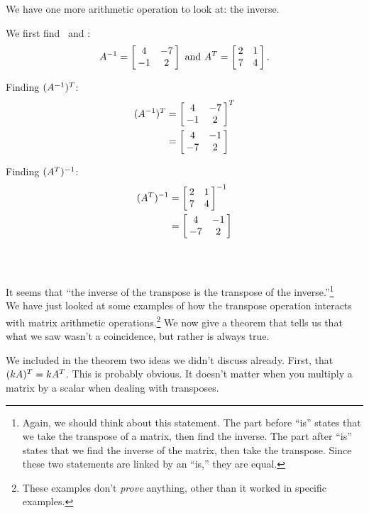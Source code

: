 We have one more arithmetic operation to look at: the inverse.\\

{We first find \ttai\ and \ttat:
$$\ttai = \bmx{cc} 4&-7\\-1&2\emx\ \text{and}\ \ttat = \bmx{cc}2&1\\7&4\emx.$$

Finding $(\ttai)^T$:
\begin{align*}
	(\ttai)^T &= \bmx{cc} 4&-7\\-1&2\emx ^T \\
					&=	\bmx{cc}4&-1\\-7&2\emx
\end{align*}

Finding $(\ttat)^{-1}$:
\begin{align*}
	(\ttat)^{-1}	&=	\bmx{cc}2&1\\7&4\emx^{-1}\\
							&=	\bmx{cc}4&-1\\-7&2\emx
\end{align*}
\ } \\ %

It seems that ``the inverse of the transpose is the transpose of the inverse.''\footnote{Again, we should think about this statement. The part before ``is'' states that we take the transpose of a matrix, then find the inverse. The part after ``is'' states that we find the inverse of the matrix, then take the transpose. Since these two statements are linked by an ``is,'' they are equal.}\\

We have just looked at some examples of how the transpose operation interacts with matrix arithmetic operations.\footnote{These examples don't \textit{prove} anything, other than it worked in specific examples.} We now give a theorem that tells us that what we saw wasn't a coincidence, but rather is always true.

We included in the theorem two ideas we didn't discuss already. First, that $(k\tta)^T = k\ttat$. This is probably obvious. It doesn't matter when you multiply a matrix by a scalar when dealing with transposes.

